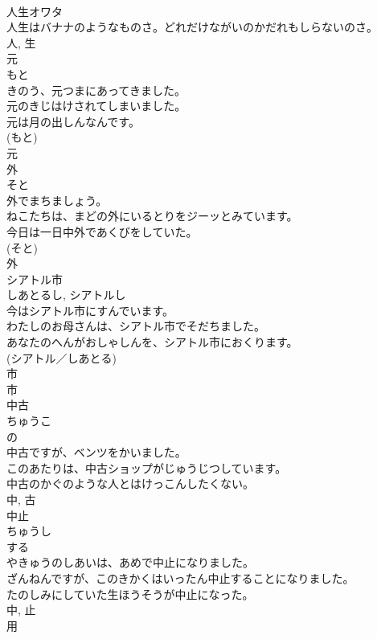 \documentclass[8pt]{extreport}
\begin{document}
\begin{CJK}{UTF8}{min}
\\	人生オワタ 
\\	人生はバナナのようなものさ。どれだけながいのかだれもしらないのさ。	
\\	人, 生	
\\	元	
\\	もと	
\\	きのう、元つまにあってきました。	
\\	元のきじはけされてしまいました。	
\\	元は月の出しんなんです。	
\\	(もと) 
\\	元	
\\	外	
\\	そと	
\\	外でまちましょう。	
\\	ねこたちは、まどの外にいるとりをジーッとみています。	
\\	今日は一日中外であくびをしていた。	
\\	(そと) 
\\	外	
\\	シアトル市	
\\	しあとるし, シアトルし	
\\	今はシアトル市にすんでいます。	
\\	わたしのお母さんは、シアトル市でそだちました。	
\\	あなたのへんがおしゃしんを、シアトル市におくります。	
\\	(シアトル／しあとる) 
\\	市 
\\	市	
\\	中古	
\\	ちゅうこ	
\\	の 
\\	中古ですが、ベンツをかいました。	
\\	このあたりは、中古ショップがじゅうじつしています。	
\\	中古のかぐのような人とはけっこんしたくない。	
\\	中, 古	
\\	中止	
\\	ちゅうし	
\\	する 
\\	やきゅうのしあいは、あめで中止になりました。	
\\	ざんねんですが、このきかくはいったん中止することになりました。	
\\	たのしみにしていた生ほうそうが中止になった。	
\\	中, 止	
\\	用	

\end{CJK}
\end{document}
